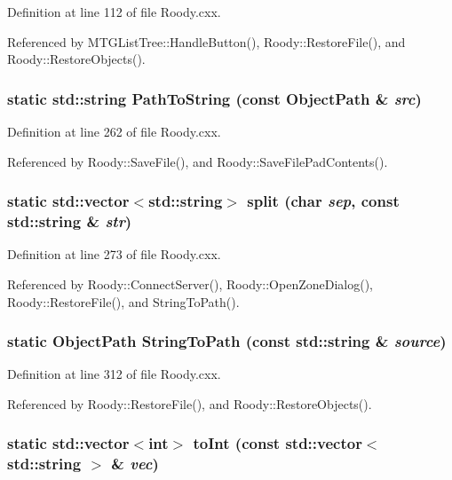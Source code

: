 Definition at line 112 of file Roody.cxx.

Referenced by MTGListTree::HandleButton(), Roody::RestoreFile(), and Roody::RestoreObjects().
\subsubsection[{PathToString}]{\setlength{\rightskip}{0pt plus 5cm}static std::string PathToString (const ObjectPath \& {\em src})\hspace{0.3cm}{\ttfamily  [static]}}\label{Roody_8cxx_afcdd7d98940322cf5d3bee7f259e4628}


Definition at line 262 of file Roody.cxx.

Referenced by Roody::SaveFile(), and Roody::SaveFilePadContents().
\subsubsection[{split}]{\setlength{\rightskip}{0pt plus 5cm}static std::vector$<$std::string$>$ split (char {\em sep}, \/  const std::string \& {\em str})\hspace{0.3cm}{\ttfamily  [static]}}\label{Roody_8cxx_a627fff1fe2fcbaca685dcd2e79087bef}


Definition at line 273 of file Roody.cxx.

Referenced by Roody::ConnectServer(), Roody::OpenZoneDialog(), Roody::RestoreFile(), and StringToPath().
\subsubsection[{StringToPath}]{\setlength{\rightskip}{0pt plus 5cm}static ObjectPath StringToPath (const std::string \& {\em source})\hspace{0.3cm}{\ttfamily  [static]}}\label{Roody_8cxx_a3488eb532681756764342f2b647dfd35}


Definition at line 312 of file Roody.cxx.

Referenced by Roody::RestoreFile(), and Roody::RestoreObjects().
\subsubsection[{toInt}]{\setlength{\rightskip}{0pt plus 5cm}static std::vector$<$int$>$ toInt (const std::vector$<$ std::string $>$ \& {\em vec})\hspace{0.3cm}{\ttfamily  [static]}}\label{Roody_8cxx_a788304d1e01753ea552251ad32485baf}


